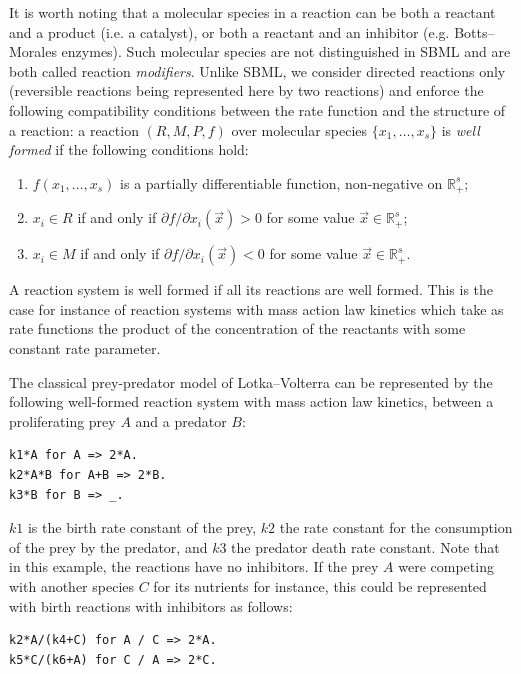 \documentclass[graybox]{svmult}
\begin{document}
It is worth noting that a molecular species in a reaction can be both a reactant and a product (i.e. a catalyst),
or both a reactant and an inhibitor (e.g. Botts--Morales enzymes). %
Such molecular species are not distinguished in SBML and are both called reaction \emph{modifiers}.
Unlike SBML, we consider directed reactions only (reversible reactions being represented here by two reactions)
and enforce the following compatibility conditions between the rate function and the structure of a reaction:
a reaction $(R,M,P,f)$ 
over molecular species $\{x_1,\dots,x_s\}$
is \emph{well formed} if the following conditions hold:
\begin{enumerate}
\item $f(x_1,\dots,x_s)$ is a partially differentiable function, non-negative
   on $\mathbb{R}_+^s$;
\item $x_i\in R$ if and only if ${\partial {f}}/ {\partial x_i}(\vec x)>0$ for some value $\vec x\in\mathbb{R}_+^s$;
\item $x_i\in M$ if and only if ${\partial {f}}/ {\partial x_i}(\vec x)<0$ for some value $\vec x\in\mathbb{R}_+^s$.
\end{enumerate}
A reaction system is well formed
if all its reactions are well formed.
This is the case for instance of reaction systems with mass action law kinetics which take as rate functions
the product of the concentration of the reactants with some constant rate parameter.

\begin{example}\label{LVr}
  The classical prey-predator model of Lotka--Volterra can be represented by the following well-formed reaction system
  with mass action law kinetics, between a proliferating prey $A$ and a predator $B$:
   \begin{lstlisting}
k1*A for A => 2*A.
k2*A*B for A+B => 2*B.
k3*B for B => _.
   \end{lstlisting}
   $k1$ is the birth rate constant of the prey,
      $k2$ the rate constant for the consumption of the prey by the predator,
and $k3$ the predator death rate constant.
   Note that in this example, the reactions have no inhibitors.
   If the prey $A$ were competing with another species $C$ for its nutrients for instance, this could be represented with birth reactions with inhibitors as follows:
   \begin{lstlisting}
k2*A/(k4+C) for A / C => 2*A.
k5*C/(k6+A) for C / A => 2*C.
   \end{lstlisting}   
\end{example}
\end{document}
